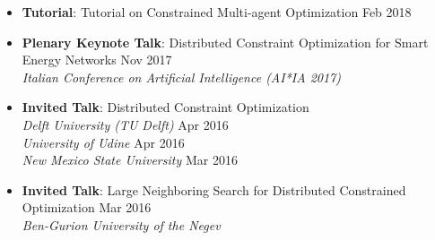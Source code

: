 \begin{itemize}





	\item {\bf Tutorial}: {Tutorial on Constrained Multi-agent Optimization} \hfill {Feb 2018}\\
  	

	\item {\bf Plenary Keynote Talk}: Distributed Constraint Optimization for Smart Energy Networks \hfill {Nov 2017}\\
    {\em Italian Conference on Artificial Intelligence (AI*IA 2017)}
	

	\item {\bf Invited Talk}: Distributed Constraint Optimization\\
	{\em Delft University (TU Delft)} \hfill {Apr 2016}\\
 	{\em University of Udine} \hfill {Apr 2016} \\ 
	{\em New Mexico State University} \hfill {Mar 2016}
	
	\item {\bf Invited Talk}: Large Neighboring Search for Distributed Constrained Optimization \hfill {Mar 2016}\\
	{\em Ben-Gurion University of the Negev}
\end{itemize}
